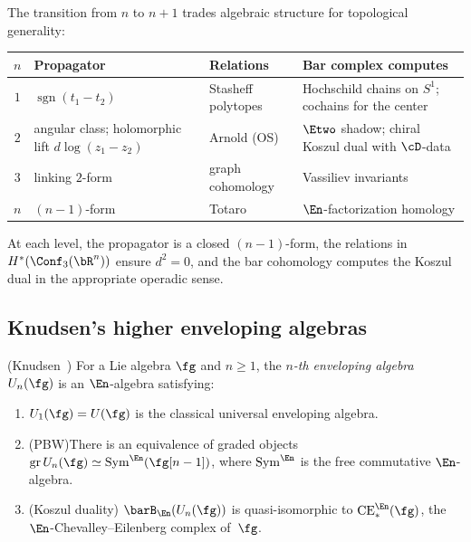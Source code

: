 \begin{remark}
\label{rem:dimensional-ladder}
The transition from $n$ to $n+1$ trades algebraic structure for
topological generality:
\begin{center}
\begin{tabular}{clll}
$n$ & Propagator & Relations & Bar complex computes \\
\hline
$1$ & $\operatorname{sgn}(t_1 - t_2)$ & Stasheff polytopes & Hochschild chains on $S^1$; cochains for the center \\
$2$ & angular class; holomorphic lift $d\log(z_1 - z_2)$ & Arnold (OS) & $\Etwo$ shadow; chiral Koszul dual with $\cD$-data \\
$3$ & linking $2$-form & graph cohomology & Vassiliev invariants \\
$n$ & $(n{-}1)$-form & Totaro & $\En$-factorization homology
\end{tabular}
\end{center}
At each level, the propagator is a closed $(n-1)$-form, the
relations in $H^*(\Conf_3(\bR^n))$ ensure $d^2 = 0$, and the bar
cohomology computes the Koszul dual in the appropriate operadic
sense.
\end{remark}


\subsection{Knudsen's higher enveloping algebras}

\begin{theorem}
\label{thm:knudsen-higher-enveloping}
\textup{(}Knudsen~\cite{Knudsen18}\textup{)}\quad
For a Lie algebra $\fg$ and $n \geq 1$, the \emph{$n$-th enveloping
algebra} $U_n(\fg)$ is an $\En$-algebra satisfying:
\begin{enumerate}[label=\textup{(\roman*)}]
\item $U_1(\fg) = U(\fg)$ is the classical universal enveloping
 algebra.
\item \textup{(PBW)}\quad There is an equivalence of graded objects
 $\mathrm{gr}\, U_n(\fg) \simeq \mathrm{Sym}^{\En}(\fg[n-1])$,
 where $\mathrm{Sym}^{\En}$ is the free commutative $\En$-algebra.
\item \textup{(Koszul duality)}\quad
 $\barB_{\En}(U_n(\fg))$ is quasi-isomorphic to
 $\mathrm{CE}^{\En}_*(\fg)$, the $\En$-Chevalley--Eilenberg
 complex of~$\fg$.
\end{enumerate}
\end{theorem}


